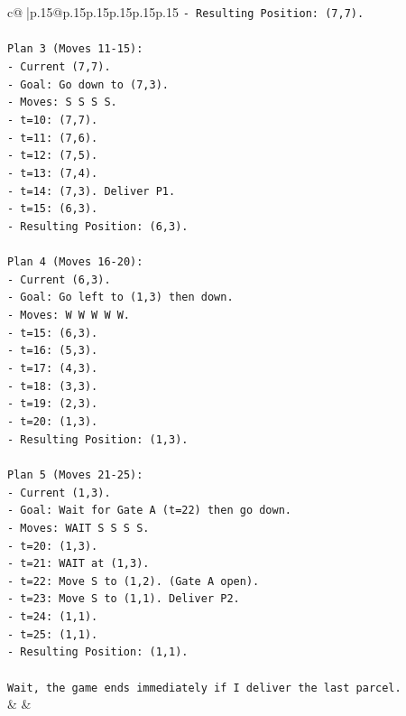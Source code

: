 \documentclass{article}
\begin{document}
{\begin{supertabular}{c@{$\;$}|p{.15\linewidth}@{}p{.15\linewidth}p{.15\linewidth}p{.15\linewidth}p{.15\linewidth}p{.15\linewidth}}
{{{\texttt{{-} Resulting Position: (7,7).} \\
\\ 
\texttt{Plan 3 (Moves 11{-}15):} \\
\texttt{{-} Current (7,7).} \\
\texttt{{-} Goal: Go down to (7,3).} \\
\texttt{{-} Moves: S S S S.} \\
\texttt{{-} t=10: (7,7).} \\
\texttt{{-} t=11: (7,6).} \\
\texttt{{-} t=12: (7,5).} \\
\texttt{{-} t=13: (7,4).} \\
\texttt{{-} t=14: (7,3). Deliver P1.} \\
\texttt{{-} t=15: (6,3).} \\
\texttt{{-} Resulting Position: (6,3).} \\
\\ 
\texttt{Plan 4 (Moves 16{-}20):} \\
\texttt{{-} Current (6,3).} \\
\texttt{{-} Goal: Go left to (1,3) then down.} \\
\texttt{{-} Moves: W W W W W.} \\
\texttt{{-} t=15: (6,3).} \\
\texttt{{-} t=16: (5,3).} \\
\texttt{{-} t=17: (4,3).} \\
\texttt{{-} t=18: (3,3).} \\
\texttt{{-} t=19: (2,3).} \\
\texttt{{-} t=20: (1,3).} \\
\texttt{{-} Resulting Position: (1,3).} \\
\\ 
\texttt{Plan 5 (Moves 21{-}25):} \\
\texttt{{-} Current (1,3).} \\
\texttt{{-} Goal: Wait for Gate A (t=22) then go down.} \\
\texttt{{-} Moves: WAIT S S S S.} \\
\texttt{{-} t=20: (1,3).} \\
\texttt{{-} t=21: WAIT at (1,3).} \\
\texttt{{-} t=22: Move S to (1,2). (Gate A open).} \\
\texttt{{-} t=23: Move S to (1,1). Deliver P2.} \\
\texttt{{-} t=24: (1,1).} \\
\texttt{{-} t=25: (1,1).} \\
\texttt{{-} Resulting Position: (1,1).} \\
\\ 
\texttt{Wait, the game ends immediately if I deliver the last parcel.} \\
            }
        }
    }
    & & \\ \\


\end{supertabular}}
\end{document}
